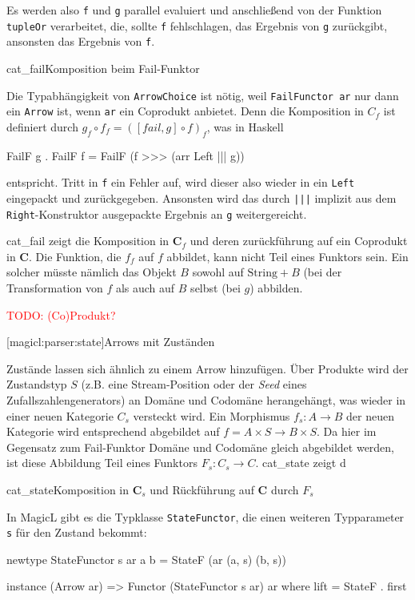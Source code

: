 \documentclass[a4paper, bibgerm]{book}
\newcommand\icode[1]{\lstinline?#1?}
\newcommand{\todo}[1]{
  \textcolor{red}{TODO: #1}
}
\newcommand\lsubsection{}
\newcommand\abb{}
\newcommand\fig{}
\newcommand\ato{\rightarrow} %
\begin{document}
Es werden also \icode{f} und \icode{g} parallel evaluiert und
anschließend von der Funktion \icode{tupleOr} verarbeitet, die, sollte
\icode{f} fehlschlagen, das Ergebnis von \icode{g} zurückgibt, ansonsten
das Ergebnis von \icode{f}.

\fig{cat_fail}{Komposition beim Fail-Funktor}

Die Typabhängigkeit von \icode{ArrowChoice} ist nötig, weil
\icode{FailFunctor ar} nur dann ein \icode{Arrow} ist, wenn \icode{ar}
ein Coprodukt anbietet. Denn die Komposition in $C_{f}$ ist definiert
durch $g_{f} \circ f_{f} = ([fail,g] \circ f)_{f}$, was in Haskell
\begin{code}
FailF g . FailF f = FailF (f >>> (arr Left ||| g))
\end{code} %
entspricht. Tritt in \icode{f} ein Fehler auf, wird dieser also wieder
in ein \icode{Left} eingepackt und zurückgegeben. Ansonsten wird das
durch \icode{|||} implizit aus dem \icode{Right}-Konstruktor ausgepackte
Ergebnis an \icode{g} weitergereicht.

\abb{cat_fail} zeigt die Komposition in $\mathbf{C}_f$ und deren
zurückführung auf ein Coprodukt in $\mathbf{C}$. Die Funktion, die $f_f$
auf $f$ abbildet, kann nicht Teil eines Funktors sein. Ein solcher
müsste nämlich das Objekt $B$ sowohl auf $\mathrm{String}+B$ (bei der
Transformation von $f$ als auch auf $B$ selbst (bei $g$) abbilden.

\todo{(Co)Produkt?}

\lsubsection[magicl:parser:state]{Arrows mit Zuständen}

Zustände lassen sich ähnlich zu einem Arrow hinzufügen. Über Produkte
wird der Zustandstyp $S$ (z.B. eine Stream-Position oder der
\textit{Seed} eines Zufallszahlengenerators) an Domäne und Codomäne
herangehängt, was wieder in einer neuen Kategorie $C_{s}$ versteckt
wird. Ein Morphismus $f_{s} : A \rightarrow B$ der neuen Kategorie wird
entsprechend abgebildet auf $f = A \times S \rightarrow B \times S$. Da
hier im Gegensatz zum Fail-Funktor Domäne und Codomäne gleich abgebildet
werden, ist diese Abbildung Teil eines Funktors $F_s: C_{s}
\ato C$. \abb{cat_state} zeigt d

\fig{cat_state}{Komposition in $\mathbf{C}_s$ und Rückführung auf
  $\mathbf{C}$ durch $F_s$}

In MagicL gibt es die Typklasse \icode{StateFunctor}, die einen weiteren
Typparameter \icode{s} für den Zustand bekommt:

\begin{code}
newtype StateFunctor s ar a b = StateF (ar (a, s) (b, s))

instance (Arrow ar) => Functor (StateFunctor s ar) ar where
    lift = StateF . first  
\end{code} %
\end{document}
